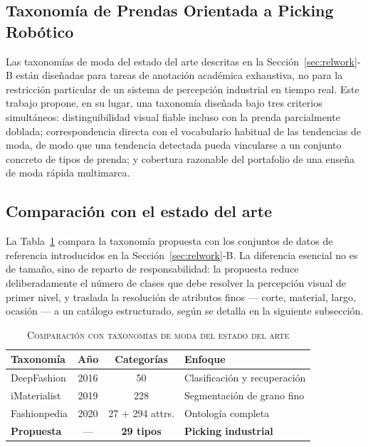\documentclass[conference]{IEEEtran}
\begin{document}
\FloatBarrier

\subsection{Taxonomía de Prendas Orientada a Picking Robótico}
\label{sec:taxonomy}

Las taxonomías de moda del estado del arte descritas en la
Sección~\ref{sec:relwork}-B están diseñadas para tareas de anotación
académica exhaustiva, no para la restricción particular de un sistema de
percepción industrial en tiempo real. Este trabajo propone, en su lugar, una
taxonomía diseñada bajo tres criterios simultáneos: distinguibilidad visual
fiable incluso con la prenda parcialmente doblada; correspondencia directa
con el vocabulario habitual de las tendencias de moda, de modo que una
tendencia detectada pueda vincularse a un conjunto concreto de tipos de
prenda; y cobertura razonable del portafolio de una enseña de moda rápida
multimarca.

\subsection{Comparación con el estado del arte}

La Tabla~\ref{tab:taxonomy} compara la taxonomía propuesta con los conjuntos
de datos de referencia introducidos en la Sección~\ref{sec:relwork}-B. La
diferencia esencial no es de tamaño, sino de reparto de responsabilidad: la
propuesta reduce deliberadamente el número de clases que debe resolver la
percepción visual de primer nivel, y traslada la resolución de atributos
finos --- corte, material, largo, ocasión --- a un catálogo estructurado,
según se detalla en la siguiente subsección.

\begin{table}[!h]
\caption{\textsc{Comparación con taxonomías de moda del estado del arte}}
\label{tab:taxonomy}
\centering
\footnotesize
\begin{tabular}{@{}lccp{2.5cm}@{}}
\toprule
\textbf{Taxonomía} & \textbf{Año} & \textbf{Categorías} & \textbf{Enfoque} \\
\midrule
DeepFashion & 2016 & 50 & Clasificación y recuperación \\
iMaterialist & 2019 & 228 & Segmentación de grano fino \\
Fashionpedia & 2020 & 27 + 294 attrs. & Ontología completa \\
\textbf{Propuesta} & --- & \textbf{29 tipos} & \textbf{Picking industrial} \\
\bottomrule
\end{tabular}
\end{table}
\end{document}
